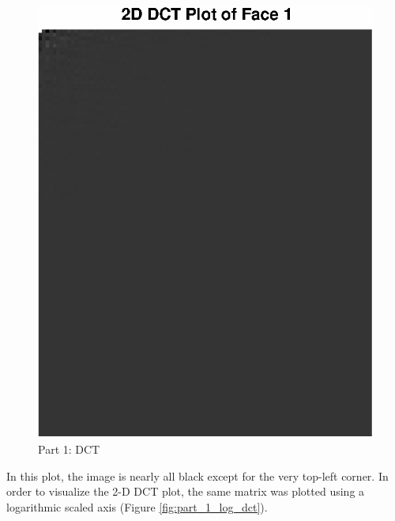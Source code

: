 \documentclass[conference]{IEEEtran}
\begin{document}
  \begin{figure}[H]
    \centering
    \includegraphics[scale=0.5]{./img/part_1_dct}
    \caption{Part 1: DCT}
    \label{fig:part_1_dct}
  \end{figure}

  In this plot, the image is nearly all black except for the very top-left
  corner. In order to visualize the 2-D DCT plot, the same matrix was plotted
  using a logarithmic scaled axis (Figure \ref{fig:part_1_log_dct}).
\end{document}
